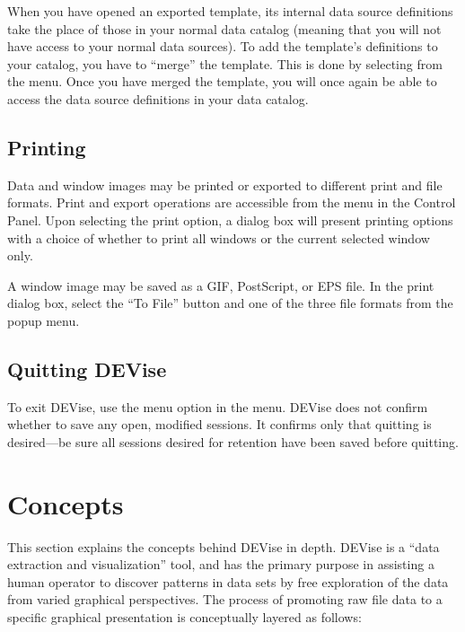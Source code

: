 When you have opened an exported template, its internal data source definitions
take the place of those in your normal data catalog (meaning that you will
not have access to your normal data sources).  To add the template's
definitions to your catalog, you have to ``merge'' the template.  This is
done by selecting  from the  menu.  Once
you have merged the template, you will once again be able to access the data
source definitions in  your data catalog.


\subsection{Printing}

Data and window images may be printed or exported to different print and file
formats. Print and export operations are accessible from the  menu
in the Control Panel. Upon selecting the print option, a dialog box will present
printing options with a choice of whether to print all windows or the current
selected window only.

A window image may be saved as a GIF, PostScript, or EPS file. In the print
dialog box, select the ``To File'' button and one of the three file formats from
the popup menu. 


\subsection{Quitting DEVise}

To exit DEVise, use the  menu option in the  menu.
DEVise does not confirm whether to save any open, modified sessions. It confirms
only that quitting is desired---be sure all sessions desired for retention have
been saved before quitting.


\section{Concepts}

This section explains the concepts behind DEVise in depth. DEVise is a ``data
extraction and visualization'' tool, and has the primary purpose in assisting a
human operator to discover patterns in data sets by free exploration of the data
from varied graphical perspectives. The process of promoting raw file data to a
specific graphical presentation is conceptually layered as follows:

